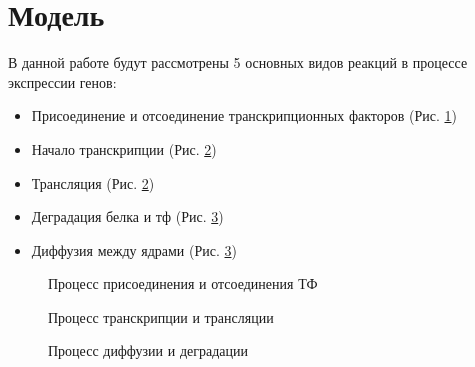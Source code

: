 \section{Модель}

В данной работе будут рассмотрены 5 основных видов реакций в процессе экспрессии генов:
\begin{itemize}
  \item Присоединение и отсоединение транскрипционных факторов (Рис. \ref{fig:geene_exp1})
  \item Начало транскрипции (Рис. \ref{fig:geene_exp2})
  \item Трансляция (Рис. \ref{fig:geene_exp2})
  \item Деградация белка и тф (Рис. \ref{fig:geene_exp3})
  \item Диффузия между ядрами (Рис. \ref{fig:geene_exp3})
\end{itemize}


\begin{figure}[!h]
  \caption{Процесс присоединения и отсоединения ТФ}
  \label{fig:geene_exp1}
\end{figure}

\begin{figure}[!h]
  \caption{Процесс транскрипции и трансляции}
  \label{fig:geene_exp2}
\end{figure}

\begin{figure}[!h]
  \caption{Процесс диффузии и деградации}
  \label{fig:geene_exp3}
\end{figure}
